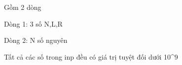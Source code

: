 Gồm 2 dòng   

    Dòng 1: 3 số N,L,R   

    Dòng 2: N số nguyên   

    Tất cả các số trong inp đều có giá trị tuyệt đối dưới 10^9